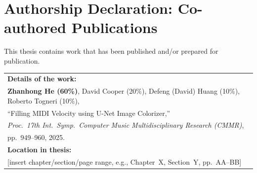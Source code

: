 \section*{\Large Authorship Declaration: Co-authored Publications}
This thesis contains work that has been published and/or prepared for publication. 
\vskip 0.5cm
	
\begin{tabular}{@{}p{\dimexpr\textwidth-2\tabcolsep\relax}@{}}
\textbf{Details of the work:} \\
\textbf{Zhanhong He (60\%)}, David Cooper (20\%), Defeng (David) Huang (10\%), Roberto Togneri (10\%),\\
``Filling MIDI Velocity using U-Net Image Colorizer,''\\
\emph{Proc.\ 17th Int.\ Symp.\ Computer Music Multidisciplinary Research (CMMR)},\\
pp.~949--960, 2025.\\
\textbf{Location in thesis:} \\
{[insert chapter/section/page range, e.g., Chapter~X, Section~Y, pp.~AA--BB]}\\%
\end{tabular} 
	
\vskip 0.5cm
	
